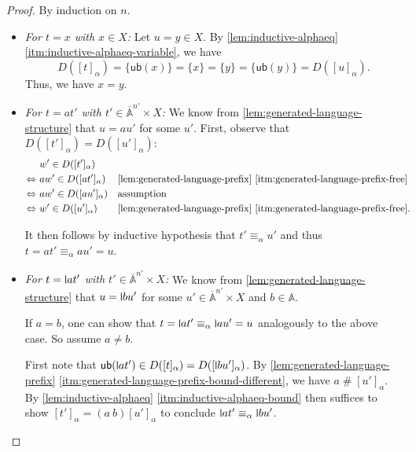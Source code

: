 \documentclass[11pt,a4paper]{amsart}
\newcommand{\Names}{\mathbb{A}}
\newcommand{\barNames}{\overline{\Names}}
\newcommand{\alphaeq}{\equiv_\alpha}
\newcommand{\fresh}{\mathbin{\#}}
\theoremstyle{plain}
\newcommand{\midmid}{\hspace{0.2ex}{\rule[-0.1ex]{0.6pt}{1.65ex}}\hspace{0.2ex}}
\newcommand{\newletter}[1]{{\midmid}#1}
\newcommand{\ub}{\mathsf{ub}}
\numberwithin{equation}{section}
\newcommand{\+}[1]{\mathcal{#1}\xspace}
\theoremstyle{definition}
\begin{document}
\begin{proof}
  By induction on \(n\).
  \begin{itemize}
      \item \textit{For \(t = x\) with \(x \in X\):}
        Let \(u = y \in X\).
        By \cref{lem:inductive-alphaeq} \eqref{itm:inductive-alphaeq-variable}, we have
        \begin{equation*}
          D([t]_\alpha) = \{\ub(x)\} = \{x\} = \{y\} = \{\ub(y)\} = D([u]_\alpha).
        \end{equation*}
        Thus, we have \(x = y\).
      \item \textit{For \(t = at'\) with \(t' \in \barNames^{n'} \times X\):}
        We know from \cref{lem:generated-language-structure} that \(u = au'\) for some \(u'\).
        First, observe that \(D([t']_\alpha) = D([u']_\alpha)\):
        \begin{align*}
          &w' \in D([t']_\alpha) \\
          \Leftrightarrow~&aw' \in D([at']_\alpha) && \text{\cref{lem:generated-language-prefix} \eqref{itm:generated-language-prefix-free}} \\
          \Leftrightarrow~&aw' \in D([au']_\alpha) && \text{assumption} \\
          \Leftrightarrow~&w' \in D([u']_\alpha) && \text{\cref{lem:generated-language-prefix} \eqref{itm:generated-language-prefix-free}}.
        \end{align*}

        It then follows by inductive hypothesis that \(t' \alphaeq u'\) and thus \(t = at' \alphaeq au' = u\).
      \item \textit{For \(t = \newletter{a}t'\) with \(t' \in \barNames^{n'} \times X\):}
        We know from \cref{lem:generated-language-structure} that \(u = \newletter{b}u'\) for some \(u' \in \barNames^{n'} \times X\) and \(b \in \Names\).

        If \(a = b\), one can show that \(t = \newletter{a}t' \alphaeq \newletter{a}u' = u\) analogously to the above case.
        So assume \(a \neq b\).

        First note that \(\ub(\newletter{a}t') \in D([t]_\alpha) = D([\newletter{b}u']_\alpha)\).
        By \cref{lem:generated-language-prefix} \eqref{itm:generated-language-prefix-bound-different}, we have \(a \fresh [u']_\alpha\).
        By \cref{lem:inductive-alphaeq} \eqref{itm:inductive-alphaeq-bound} then suffices to show \([t']_\alpha = (a\ b) [u']_\alpha\) to conclude \(\newletter{a}t' \alphaeq \newletter{b}u'\).


\end{itemize}
\end{proof}
\end{document}
